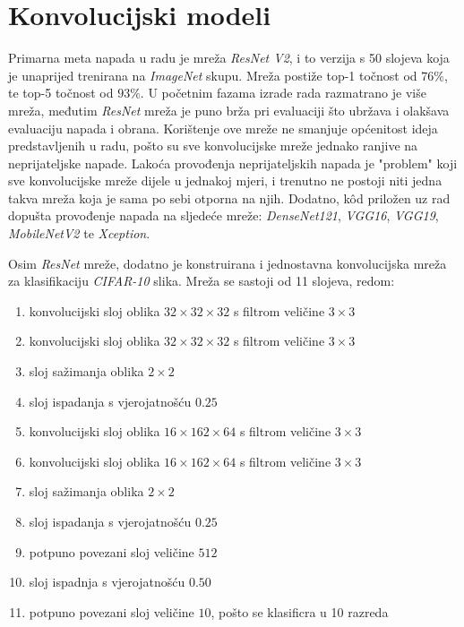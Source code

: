 \documentclass[utf8, diplomski]{fer}
\begin{document}
\section{Konvolucijski modeli}
Primarna meta napada u radu je mreža \textit{ResNet V2}\citep{resnetv2}, i to verzija s 50 slojeva koja je unaprijed trenirana na \textit{ImageNet} skupu. Mreža postiže top-1 točnost od $76\%$, te top-5 točnost od $93\%$.  U početnim fazama izrade rada razmatrano je više mreža, međutim \textit{ResNet} mreža je puno brža pri evaluaciji što ubržava i olakšava evaluaciju napada i obrana. Korištenje ove mreže ne smanjuje općenitost ideja predstavljenih u radu, pošto su sve konvolucijske mreže jednako ranjive na neprijateljske napade. Lakoća provođenja neprijateljskih napada je "problem" koji sve konvolucijske mreže dijele u jednakoj mjeri, i trenutno ne postoji niti jedna takva mreža koja je sama po sebi otporna na njih. Dodatno, kôd priložen uz rad dopušta provođenje napada na sljedeće mreže: \textit{DenseNet121}, \textit{VGG16}, \textit{VGG19}, \textit{MobileNetV2} te \textit{Xception}.
\par
Osim \textit{ResNet} mreže, dodatno je konstruirana i jednostavna konvolucijska mreža za klasifikaciju \textit{CIFAR-10} slika. Mreža se sastoji od 11 slojeva, redom:
\begin{enumerate}[noitemsep, label=\textbullet]
  \item konvolucijski sloj oblika $32\times32\times32$ s filtrom veličine $3\times3$
  \item konvolucijski sloj oblika $32\times32\times32$ s filtrom veličine $3\times3$
  \item sloj sažimanja oblika $2\times2$
  \item sloj ispadanja s vjerojatnošću $0.25$
  \item konvolucijski sloj oblika $16\times162\times64$ s filtrom veličine $3\times3$
  \item konvolucijski sloj oblika $16\times162\times64$ s filtrom veličine $3\times3$
  \item sloj sažimanja oblika $2\times2$
  \item sloj ispadanja s vjerojatnošću $0.25$
  \item potpuno povezani sloj veličine $512$
  \item sloj ispadnja s vjerojatnošću $0.50$
  \item potpuno povezani sloj veličine $10$, pošto se klasificra u 10 razreda
\end{enumerate}
\end{document}
